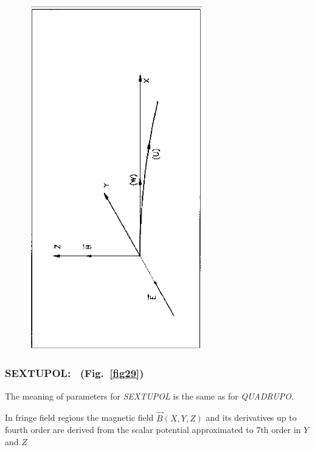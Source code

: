 \vfill

\begin{figure}[H]
\centerline{\includegraphics[height=15cm,angle=-90]{Fig28.ps}}
{\setlength{\captionwidth}{14cm}
 }
\end{figure}
\vfill

\newpage

\subsubsection*{SEXTUPOL: \SEXTUPOLTitl\ (Fig.~\protect\ref{fig29})} 
     \label{SEXTUPOL}   

The meaning of parameters for \textsl{SEXTUPOL} is the same as 
for \textsl{QUADRUPO}.  
\medskip

\noindent In fringe field regions the magnetic field $ \vec  B(X,Y,Z) $ and
its derivatives up to fourth order are derived from the scalar potential approximated to 
7th order in $ Y $ and $ Z $

